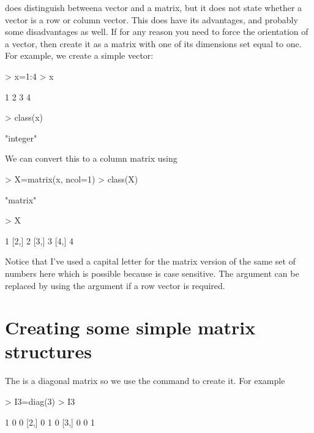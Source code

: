 \R{} does distinguish betweena vector and a matrix, but it does not state whether a vector is a row or column vector. This does have its advantages, and probably some disadvantages as well. If for any reason you need to force the orientation of a vector, then create it as a matrix with one of its dimensions set equal to one. For example, we create a simple vector: 
\begin{Schunk}
\begin{Sinput}
> x=1:4 
> x 
\end{Sinput}
\begin{Soutput}
[1] 1 2 3 4
\end{Soutput}
\begin{Sinput}
> class(x) 
\end{Sinput}
\begin{Soutput}
[1] "integer"
\end{Soutput}
\end{Schunk}
We can convert this to a column matrix using 
\begin{Schunk}
\begin{Sinput}
> X=matrix(x, ncol=1) 
> class(X) 
\end{Sinput}
\begin{Soutput}
[1] "matrix"
\end{Soutput}
\begin{Sinput}
> X 
\end{Sinput}
\begin{Soutput}
     [,1]
[1,]    1
[2,]    2
[3,]    3
[4,]    4
\end{Soutput}
\end{Schunk}
Notice that I've used a capital letter for the matrix version of the same set of numbers here which is possible because \R{} is case sensitive. The  argument can be replaced by using the  argument if a row vector is required. 
 
\section{Creating some simple matrix structures} 
 
The  is a diagonal matrix so we use the  command to create it. For example 
\begin{Schunk}
\begin{Sinput}
> I3=diag(3) 
> I3 
\end{Sinput}
\begin{Soutput}
     [,1] [,2] [,3]
[1,]    1    0    0
[2,]    0    1    0
[3,]    0    0    1
\end{Soutput}
\end{Schunk}
 
